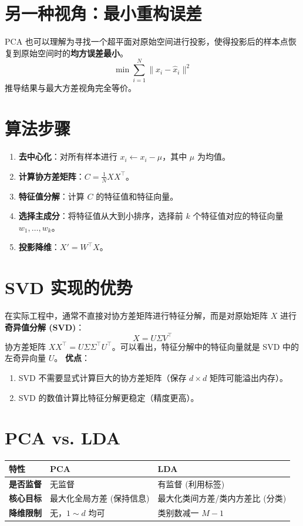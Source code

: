 \documentclass[12pt, a4paper]{book}
\begin{document}
\section{另一种视角：最小重构误差}
PCA 也可以理解为寻找一个超平面对原始空间进行投影，使得投影后的样本点恢复到原始空间时的\textbf{均方误差最小}。
$$ \min \sum_{i=1}^N \|x_i - \hat{x}_i\|^2 $$
推导结果与最大方差视角完全等价。

\section{算法步骤}
\begin{enumerate}
    \item \textbf{去中心化}：对所有样本进行 $x_i \leftarrow x_i - \mu$，其中 $\mu$ 为均值。
    \item \textbf{计算协方差矩阵}：$C = \frac{1}{N} XX^\top$。
    \item \textbf{特征值分解}：计算 $C$ 的特征值和特征向量。
    \item \textbf{选择主成分}：将特征值从大到小排序，选择前 $k$ 个特征值对应的特征向量 $w_1, \dots, w_k$。
    \item \textbf{投影降维}：$X' = W^\top X$。
\end{enumerate}

\section{SVD 实现的优势}
在实际工程中，通常不直接对协方差矩阵进行特征分解，而是对原始矩阵 $X$ 进行\textbf{奇异值分解 (SVD)}：
$$ X = U \Sigma V^\top $$
协方差矩阵 $XX^\top = U \Sigma \Sigma^\top U^\top$。可以看出，特征分解中的特征向量就是 SVD 中的左奇异向量 $U$。
\textbf{优点}：
\begin{enumerate}
    \item SVD 不需要显式计算巨大的协方差矩阵（保存 $d \times d$ 矩阵可能溢出内存）。
    \item SVD 的数值计算比特征分解更稳定（精度更高）。
\end{enumerate}

\section{PCA vs. LDA}
\begin{table}[h]
\centering
\begin{tabularx}{\textwidth}{|l|X|X|}
\hline
\textbf{特性} & \textbf{PCA} & \textbf{LDA} \\
\hline
\textbf{是否监督} & 无监督 & 有监督 (利用标签) \\
\hline
\textbf{核心目标} & 最大化全局方差 (保持信息) & 最大化类间方差/类内方差比 (分类) \\
\hline
\textbf{降维限制} & 无，$1 \sim d$ 均可 & 类别数减一 $M-1$ \\
\hline
\end{tabularx}
\end{table}
\end{document}
